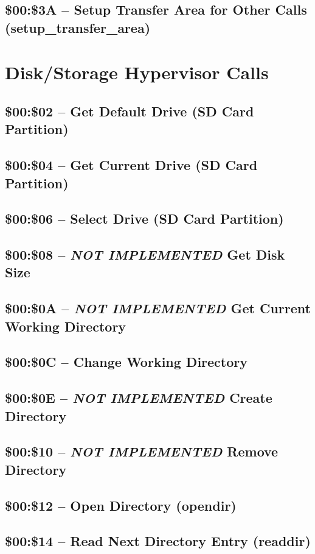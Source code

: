 \subsection{\$00:\$3A -- Setup Transfer Area for Other Calls (setup\_transfer\_area)}

\section{Disk/Storage Hypervisor Calls}

\subsection{\$00:\$02 -- Get Default Drive (SD Card Partition)}
\subsection{\$00:\$04 -- Get Current Drive (SD Card Partition)}
\subsection{\$00:\$06 -- Select Drive (SD Card Partition)}
\subsection{\$00:\$08 -- {\em NOT IMPLEMENTED} Get Disk Size}
\subsection{\$00:\$0A -- {\em NOT IMPLEMENTED} Get Current Working Directory}
\subsection{\$00:\$0C -- Change Working Directory}
\subsection{\$00:\$0E -- {\em NOT IMPLEMENTED} Create Directory}

\subsection{\$00:\$10 -- {\em NOT IMPLEMENTED} Remove Directory}
\subsection{\$00:\$12 -- Open Directory (opendir)}
\subsection{\$00:\$14 -- Read Next Directory Entry (readdir)}
